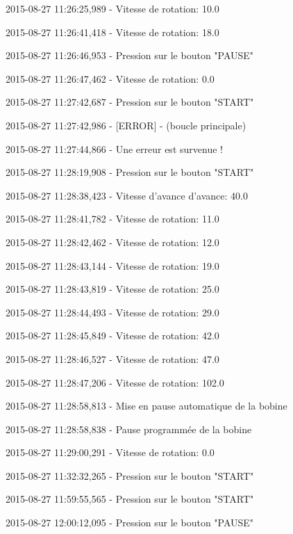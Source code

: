 \documentclass[a4paper, 11pt]{article}
\begin{document}
2015-08-27 11\string:26\string:25,989 - Vitesse de rotation\string: 10.0

2015-08-27 11\string:26\string:41,418 - Vitesse de rotation\string: 18.0

2015-08-27 11\string:26\string:46,953 - Pression sur le bouton "PAUSE"

2015-08-27 11\string:26\string:47,462 - Vitesse de rotation\string: 0.0

2015-08-27 11\string:27\string:42,687 - Pression sur le bouton "START"

2015-08-27 11\string:27\string:42,986 - [ERROR] - (boucle principale)

2015-08-27 11\string:27\string:44,866 - Une erreur est survenue !

2015-08-27 11\string:28\string:19,908 - Pression sur le bouton "START"

2015-08-27 11\string:28\string:38,423 - Vitesse d'avance d'avance\string: 40.0

2015-08-27 11\string:28\string:41,782 - Vitesse de rotation\string: 11.0

2015-08-27 11\string:28\string:42,462 - Vitesse de rotation\string: 12.0

2015-08-27 11\string:28\string:43,144 - Vitesse de rotation\string: 19.0

2015-08-27 11\string:28\string:43,819 - Vitesse de rotation\string: 25.0

2015-08-27 11\string:28\string:44,493 - Vitesse de rotation\string: 29.0

2015-08-27 11\string:28\string:45,849 - Vitesse de rotation\string: 42.0

2015-08-27 11\string:28\string:46,527 - Vitesse de rotation\string: 47.0

2015-08-27 11\string:28\string:47,206 - Vitesse de rotation\string: 102.0

2015-08-27 11\string:28\string:58,813 - Mise en pause automatique de la bobine

2015-08-27 11\string:28\string:58,838 - Pause programmée de la bobine

2015-08-27 11\string:29\string:00,291 - Vitesse de rotation\string: 0.0

2015-08-27 11\string:32\string:32,265 - Pression sur le bouton "START"

2015-08-27 11\string:59\string:55,565 - Pression sur le bouton "START"

2015-08-27 12\string:00\string:12,095 - Pression sur le bouton "PAUSE"
\end{document}

